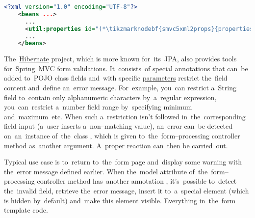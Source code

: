\begin{lstlisting}[language=XML, title={Spring XML configuration}]
    <?xml version="1.0" encoding="UTF-8"?>
    <beans ...>
      ...
      <util:properties id="(*\tikzmarknodebf{smvc5xml2props}{propertiesFileId}[ForestGreen]*)" location="WEB-INF/fileName.properties"/>
      ...
    </beans>
\end{lstlisting}

The~\hyperref[hibernate]{Hibernate} project, which is more known for~its~JPA, also provides tools for~Spring~MVC form validations.
It~consists~of special annotations that can~be added to~POJO class fields and~with specific \hyperref[parameterargument]{parameters} restrict the~field content and~define an~error message.
For~example, you~can restrict a~String field to~contain only alphanumeric characters by~a~regular expression, you~can~restrict a~number field range by~specifying minimum and~maximum~etc.
When such a~restriction isn't followed in~the~corresponding field input (a~user inserts a~non--matching value), an~error can~be detected on~an~instance of~the~class , which is given to~the~form--processing controller method as~another \hyperref[parameterargument]{argument}.
A~proper reaction can~then be carried~out.

Typical use case is to~return to~the~form page and~display some warning with the~error message defined earlier.
When the~model attribute of~the~form--processing controller method has~another annotation , it's~possible to~detect the~invalid field, retrieve the~error message, insert it to~a~special element (which is hidden by~default) and~make this element visible.
Everything in~the~form template code.
\newpage

